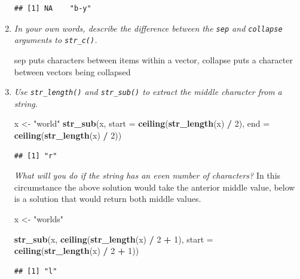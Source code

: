 \documentclass[]{book}
\newenvironment{Shaded}{\begin{snugshade}}{\end{snugshade}}
\newcommand{\DataTypeTok}[1]{\textcolor[rgb]{0.13,0.29,0.53}{#1}}
\newcommand{\DecValTok}[1]{\textcolor[rgb]{0.00,0.00,0.81}{#1}}
\newcommand{\KeywordTok}[1]{\textcolor[rgb]{0.13,0.29,0.53}{\textbf{#1}}}
\newcommand{\NormalTok}[1]{#1}
\newcommand{\OperatorTok}[1]{\textcolor[rgb]{0.81,0.36,0.00}{\textbf{#1}}}
\newcommand{\StringTok}[1]{\textcolor[rgb]{0.31,0.60,0.02}{#1}}
\theoremstyle{definition}
\theoremstyle{definition}
\theoremstyle{definition}
\theoremstyle{remark}
\begin{document}
\begin{enumerate}
\begin{verbatim}
## [1] NA    "b-y"
\end{verbatim}
\item
  \emph{In your own words, describe the difference between the
  \texttt{sep} and \texttt{collapse}} \emph{arguments to
  \texttt{str\_c()}.}

  sep puts characters between items within a vector, collapse puts a
  character between vectors being collapsed
\item
  \emph{Use \texttt{str\_length()} and \texttt{str\_sub()} to extract
  the middle character from } \emph{a string.}

\begin{Shaded}
\begin{Highlighting}[]
\NormalTok{x <-}\StringTok{ "world"}
\KeywordTok{str_sub}\NormalTok{(x, }\DataTypeTok{start =} \KeywordTok{ceiling}\NormalTok{(}\KeywordTok{str_length}\NormalTok{(x) }\OperatorTok{/}\StringTok{ }\DecValTok{2}\NormalTok{), }\DataTypeTok{end =} \KeywordTok{ceiling}\NormalTok{(}\KeywordTok{str_length}\NormalTok{(x) }\OperatorTok{/}\StringTok{ }\DecValTok{2}\NormalTok{))}
\end{Highlighting}
\end{Shaded}

\begin{verbatim}
## [1] "r"
\end{verbatim}

  \emph{What will you do if the string has an even number of
  characters?} In this circumstance the above solution would take the
  anterior middle value, below is a solution that would return both
  middle values.

\begin{Shaded}
\begin{Highlighting}[]
\NormalTok{x <-}\StringTok{ "worlds"}

\KeywordTok{str_sub}\NormalTok{(x, }\KeywordTok{ceiling}\NormalTok{(}\KeywordTok{str_length}\NormalTok{(x) }\OperatorTok{/}\StringTok{ }\DecValTok{2} \OperatorTok{+}\StringTok{ }\DecValTok{1}\NormalTok{), }\DataTypeTok{start =} \KeywordTok{ceiling}\NormalTok{(}\KeywordTok{str_length}\NormalTok{(x) }\OperatorTok{/}\StringTok{ }\DecValTok{2} \OperatorTok{+}\StringTok{ }\DecValTok{1}\NormalTok{))}
\end{Highlighting}
\end{Shaded}

\begin{verbatim}
## [1] "l"
\end{verbatim}


\end{enumerate}
\end{document}
